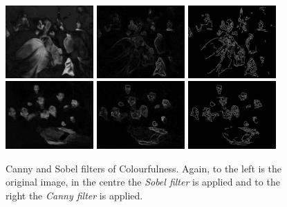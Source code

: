 \documentclass[11pt,a4paper,twoside,openright,draft]{report}
\begin{document}
\begin{multicols}{2}
\begin{figure}[tbp]
\centering
\includegraphics[width=0.30\textwidth]{CS_caravaggio_1962_139_1}
\includegraphics[width=0.30\textwidth]{sobel_CS_caravaggio_1962_139_1}
\includegraphics[width=0.30\textwidth]{canny_CS_caravaggio_1962_139_1}
\includegraphics[width=0.30\textwidth]{CS_rembrandt_eu_464}
\includegraphics[width=0.30\textwidth]{sobel_CS_rembrandt_eu_464}
\includegraphics[width=0.30\textwidth]{canny_CS_rembrandt_eu_464}
\caption[Canny and Sobel filters of Colourfulness]{Canny and Sobel filters of
Colourfulness.  Again, to the left is the original image, in the centre the
\emph{Sobel filter} is applied and to the right the \emph{Canny filter} is
applied.}
\label{fig:cannysobelcs}
\end{figure}


\end{multicols}
\end{document}
